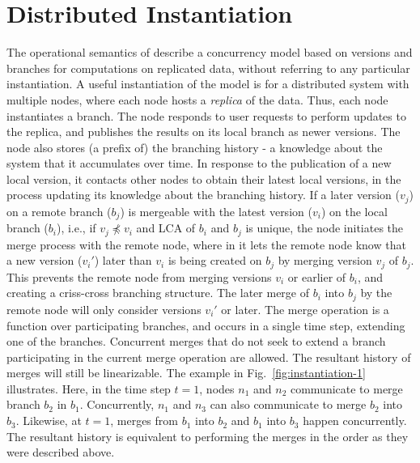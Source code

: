 \section{Distributed Instantiation}
\label{sec:system-model}

The operational semantics of \name describe a concurrency model based
on versions and branches for computations on replicated data, without
referring to any particular instantiation. A useful instantiation of
the model is for a distributed system with multiple nodes, where
each node hosts a \emph{replica} of the data. Thus, each node
instantiates a branch. The node responds to user requests to perform
updates to the replica, and publishes the results on its local branch
as newer versions. The node also stores (a prefix of) the branching
history - a knowledge about the system that it accumulates over time.
In response to the publication of a new local version, it contacts
other nodes to obtain their latest local versions, in the process
updating its knowledge about the branching history. If a later version
($v_j$) on a remote branch ($b_j$) is mergeable with the latest
version ($v_i$) on the local branch ($b_i$), i.e., if $v_j \not\preceq
v_i$ and LCA of $b_i$ and $b_j$ is unique, the node initiates the
merge process with the remote node, where in it lets the remote node
know that a new version ($v_i'$) later than $v_i$ is being created on
$b_j$ by merging version $v_j$ of $b_j$. This prevents the remote node
from merging versions $v_i$ or earlier of $b_i$, and creating a
criss-cross branching structure. The later merge of $b_i$ into $b_j$
by the remote node will only consider versions $v_i'$ or later. The
merge operation is a function over participating branches, and occurs
in a single time step, extending one of the branches. Concurrent
merges that do not seek to extend a branch participating in the
current merge operation are allowed. The resultant history of merges
will still be linearizable. The example in
Fig.~\ref{fig:instantiation-1} illustrates. Here, in the time step
$t=1$, nodes $n_1$ and $n_2$ communicate to merge branch $b_2$ in
$b_1$. Concurrently, $n_1$ and $n_3$ can also communicate to merge
$b_2$ into $b_3$. Likewise, at $t=1$, merges from $b_1$ into $b_2$ and
$b_1$ into $b_3$ happen concurrently. The resultant history is
equivalent to performing the merges in the order as they were
described above.


